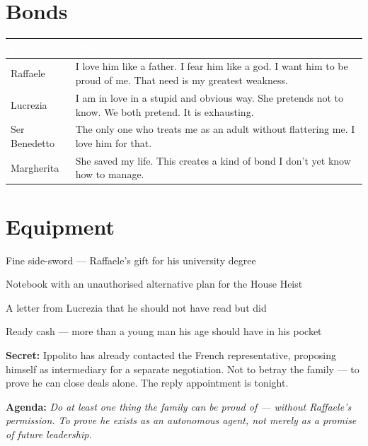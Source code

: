 \section*{Bonds}
\begin{table}[h]\centering\renewcommand{\arraystretch}{1.4}
\begin{tabularx}{\linewidth}{@{}L{2.6cm} X@{}}
\toprule{}
\textcolor{white}{\textbf{PC}} & \textcolor{white}{\textbf{Bond}} \\
\midrule
Raffaele & I love him like a father. I fear him like a god. I want him to be proud of me. That need is my greatest weakness. \\
Lucrezia & I am in love in a stupid and obvious way. She pretends not to know. We both pretend. It is exhausting. \\
Ser Benedetto & The only one who treats me as an adult without flattering me. I love him for that. \\
Margherita & She saved my life. This creates a kind of bond I don't yet know how to manage. \\
\bottomrule
\end{tabularx}
\end{table}

\section*{Equipment}
\begin{goldlist}
\item Fine side-sword --- Raffaele's gift for his university degree
\item Notebook with an unauthorised alternative plan for the House Heist
\item A letter from Lucrezia that he should not have read but did
\item Ready cash --- more than a young man his age should have in his pocket
\end{goldlist}

\clearpage
\begin{secretbox}
\textbf{Secret:} Ippolito has already contacted the French representative, proposing
himself as intermediary for a separate negotiation. Not to betray the family ---
to prove he can close deals alone. The reply appointment is tonight.

\medskip\noindent\textcolor{SecretRed}{\textbf{Agenda:}} \textit{Do at least one
thing the family can be proud of --- without Raffaele's permission. To prove he
exists as an autonomous agent, not merely as a promise of future leadership.}
\end{secretbox}
